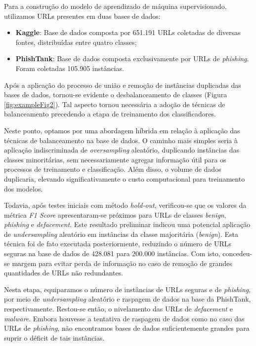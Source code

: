 \documentclass[manuscript,screen,review]{acmart}
\begin{document}
Para a construção do modelo de aprendizado de máquina supervisionado, utilizamos URLs presentes em duas bases de dados:

\begin{itemize}
    \setlength{\itemsep}{10pt}
    \item \textbf{Kaggle}\footnotemark: Base de dados composta por 651.191 URLs coletadas de diversas fontes, distribuídas entre quatro classes;
    \item \textbf{PhishTank}\footnotemark: Base de dados composta exclusivamente por URLs de \emph{phishing}. Foram coletadas 105.905 instâncias. 
\end{itemize}


Após a aplicação do processo de união e remoção de instâncias duplicadas das bases de dados, tornou-se evidente o desbalanceamento de classes (Figura \ref{fig:exampleFig2}). Tal aspecto tornou necessária a adoção de técnicas de balanceamento precedendo a etapa de treinamento dos classificadores.

Neste ponto, optamos por uma abordagem híbrida em relação à aplicação das técnicas de balanceamento na base de dados. O caminho mais simples seria à aplicação indiscriminada de \emph{oversampling} aleatório, duplicando instâncias das classes minoritárias, sem necessariamente agregar informação útil para os processos de treinamento e classificação. Além disso, o volume de dados duplicaria, elevando significativamente o custo computacional para treinamento dos modelos.

Todavia, após testes iniciais com método \emph{hold-out}, verificou-se que os valores da métrica \emph{F1 Score} apresentaram-se próximos para URLs de classes \emph{benign}, \emph{phishing} e \emph{defacement}. Este resultado preliminar indicou uma potencial aplicação de \emph{undersampling} aleatório em instâncias da classe majoritária (\emph{benign}). Esta técnica foi de fato executada posteriormente, reduzindo o número de URLs seguras na base de dados de 428.081 para 200.000 instâncias. Com isto, concedeu-se margem para evitar perda de informação no caso de remoção de grandes quantidades de URLs não redundantes.

Nesta etapa, equiparamos o número de instâncias de URLs seguras e de \emph{phishing}, por meio de \emph{undersampling} aleatório e raspagem de dados na base da PhishTank, respectivamente. Restou-se então, o nivelamento das URLs de \emph{defacement} e \emph{malware}. Embora houvesse a tentativa de raspagem de dados como no caso das URLs de \emph{phishing}, não encontramos bases de dados suficientemente grandes para suprir o déficit de tais instâncias.
\end{document}
